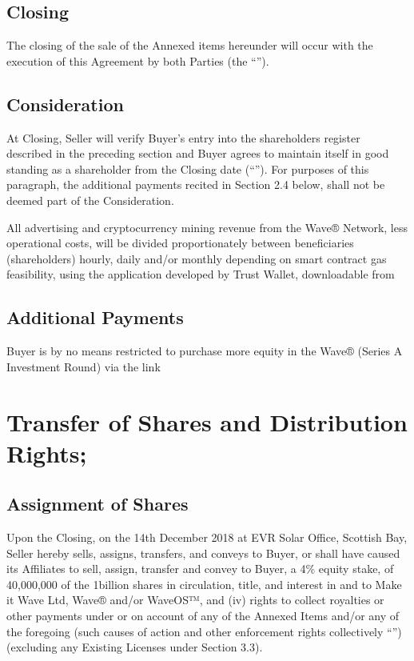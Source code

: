\documentclass[letterpaper,10pt,english]{sphinxmanual}
\begin{document}
\subsection{Closing}
\label{\detokenize{2-delivery:closing}}
The closing of the sale of the Annexed items hereunder will occur with the execution of this Agreement by both Parties (the “”).


\subsection{Consideration}
\label{\detokenize{2-delivery:consideration}}
At Closing, Seller will verify Buyer’s entry into the shareholders register described in the preceding section and Buyer agrees to maintain itself in good standing as a shareholder from the Closing date (“”). For purposes of this paragraph, the additional payments recited in Section 2.4 below, shall not be deemed part of the Consideration.

All advertising and cryptocurrency mining revenue from the Wave® Network, less operational costs, will be divided proportionately between beneficiaries (shareholders) hourly, daily and/or monthly depending on smart contract gas feasibility, using the application developed by Trust Wallet, downloadable from 


\subsection{Additional Payments}
\label{\detokenize{2-delivery:additional-payments}}
Buyer is by no means restricted to purchase more equity in the Wave® (Series A Investment Round) via the link 


\section{Transfer of Shares and Distribution Rights;}
\label{\detokenize{3-transfer:transfer-of-shares-and-distribution-rights}}\label{\detokenize{3-transfer::doc}}

\subsection{Assignment of Shares}
\label{\detokenize{3-transfer:assignment-of-shares}}
Upon the Closing, on the 14th December 2018 at EVR Solar Office, Scottish Bay, Seller hereby sells, assigns, transfers, and conveys to Buyer, or shall have caused its Affiliates to sell, assign, transfer and convey to Buyer, a 4\% equity stake, of 40,000,000 of the 1billion shares in circulation, title, and interest in and to Make it Wave Ltd, Wave® and/or WaveOS™, and (iv) rights to collect royalties or other payments under or on account of any of the Annexed Items and/or any of the foregoing (such causes of action and other enforcement rights collectively “”) (excluding any Existing Licenses under Section 3.3).
\end{document}
